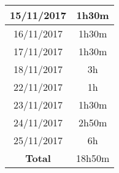 \begin{tabular}{|c|c|}

	\hline

15/11/2017	& 1h30m \\ 

	\hline 

16/11/2017	& 1h30m \\ 

	\hline 

17/11/2017	& 1h30m \\ 

	\hline 

18/11/2017	& 3h \\ 

	\hline 

22/11/2017	& 1h \\ 

	\hline 

23/11/2017	& 1h30m \\ 

	\hline 

24/11/2017	& 2h50m \\ 

	\hline 

25/11/2017	& 6h \\ 

	\hline

\textbf{Total}	& 18h50m \\

	\hline

\end{tabular}